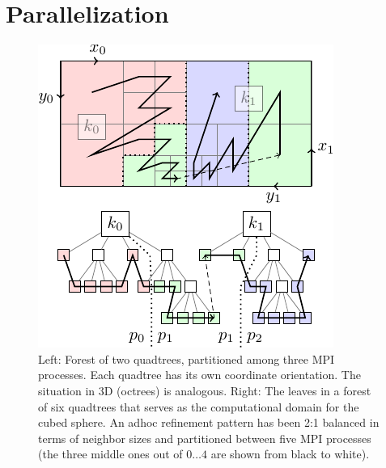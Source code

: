 \documentclass{IOS-Book-Article}     %
\begin{document}
\section{Parallelization}

\begin{figure}
\begin{center}
\includegraphics[width=.4\columnwidth]{../figs_misc/forest_stacked}
\hspace{.05\columnwidth}
\end{center}
\caption{Left: Forest of two quadtrees, partitioned among three MPI processes.
Each quadtree has its own coordinate orientation.  The situation in 3D
(octrees) is analogous.  Right: The leaves in a forest of six quadtrees that
serves as the computational domain for the cubed sphere.  An adhoc refinement
pattern has been 2:1 balanced in terms of neighbor sizes and partitioned
between five MPI processes (the three middle ones out of $0 \ldots 4$
are shown from black to white).}
\label{fig:cubed3}
\end{figure}
\end{document}
